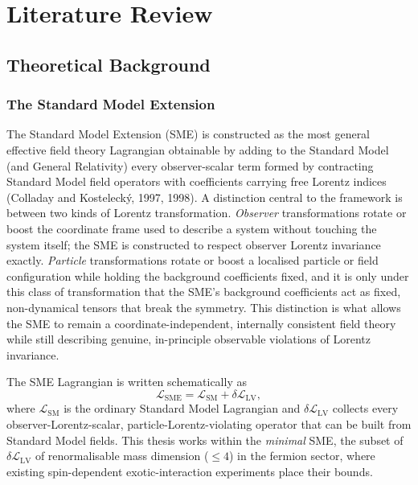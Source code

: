\chapter{Literature Review}
\label{ch:litreview}

\section{Theoretical Background}
\label{sec:theory-background}

\subsection{The Standard Model Extension}
\label{sec:sme}

The Standard Model Extension (SME) is constructed as the most general
effective field theory Lagrangian obtainable by adding to the Standard
Model (and General Relativity) every observer-scalar term formed by
contracting Standard Model field operators with coefficients carrying free
Lorentz indices (Colladay and Kostelecký, 1997, 1998). A distinction
central to the framework is between two kinds of Lorentz transformation.
\emph{Observer} transformations rotate or boost the coordinate frame used
to describe a system without touching the system itself; the SME is
constructed to respect observer Lorentz invariance exactly. \emph{Particle}
transformations rotate or boost a localised particle or field
configuration while holding the background coefficients fixed, and it is
only under this class of transformation that the SME's background
coefficients act as fixed, non-dynamical tensors that break the symmetry.
This distinction is what allows the SME to remain a coordinate-independent,
internally consistent field theory while still describing genuine,
in-principle observable violations of Lorentz invariance.

The SME Lagrangian is written schematically as
\begin{equation}
  \mathcal{L}_{\mathrm{SME}} = \mathcal{L}_{\mathrm{SM}} + \delta\mathcal{L}_{\mathrm{LV}},
\end{equation}
where $\mathcal L_{\mathrm{SM}}$ is the ordinary Standard Model Lagrangian
and $\delta\mathcal L_{\mathrm{LV}}$ collects every observer-Lorentz-scalar,
particle-Lorentz-violating operator that can be built from Standard Model
fields. This thesis works within the \emph{minimal} SME, the subset of
$\delta\mathcal L_{\mathrm{LV}}$ of renormalisable mass dimension
($\leq4$) in the fermion sector, where existing spin-dependent
exotic-interaction experiments place their bounds.

